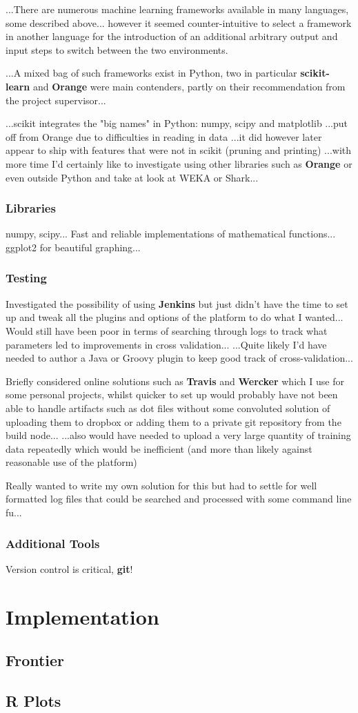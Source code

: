 ...There are numerous machine learning frameworks available in many languages,
some described above... however it seemed counter-intuitive to select a
framework in another language for the introduction of an additional arbitrary
output and input steps to switch between the two environments.

...A mixed bag of such frameworks exist in Python, two in particular
\textbf{scikit-learn} and \textbf{Orange} were main contenders, partly on their
recommendation from the project supervisor...

...scikit integrates the "big names" in Python: numpy, scipy and matplotlib
...put off from Orange due to difficulties in reading in data ...it did however
later appear to ship with features that were not in scikit (pruning and
printing) ...with more time I'd certainly like to investigate using other
libraries such as \textbf{Orange} or even outside Python and take at look at WEKA
or Shark...

\subsubsection{Libraries}
numpy, scipy... Fast and reliable implementations of
mathematical functions...  ggplot2 for beautiful graphing...

\subsubsection{Testing}
Investigated the possibility of using \textbf{Jenkins}
but just didn't have the time to set up and tweak all the plugins and options of
the platform to do what I wanted... Would still have been poor in terms of
searching through logs to track what parameters led to improvements in cross
validation... ...Quite likely I'd have needed to author a Java or Groovy plugin
to keep good track of cross-validation...

Briefly considered online solutions such as \textbf{Travis} and \textbf{Wercker}
which I use for some personal projects, whilst quicker to set up would probably
have not been able to handle artifacts such as dot files without some convoluted
solution of uploading them to dropbox or adding them to a private git repository
from the build node...  ...also would have needed to upload a very large
quantity of training data repeatedly which would be inefficient (and more than
likely against reasonable use of the platform)

Really wanted to write my own solution for this but had to settle for well
formatted log files that could be searched and processed with some command line
fu...

\subsubsection{Additional Tools}
Version control is critical, \textbf{git}!


\section{Implementation}
\subsection{Frontier}
\subsection{R Plots}

